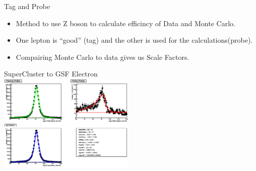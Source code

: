 

\begin{frame}{Tag and Probe}
\begin {itemize}
  \item
    Method to use Z boson to calculate efficincy of Data and Monte Carlo.
  \item
    One lepton is ``good'' (tag) and the other is used for the calculations(probe).
  \item
    Compairing Monte Carlo to data gives us Scale Factors.
\end{itemize}
\begin{center}
SuperCluster to GSF Electron\\
\includegraphics[width=0.49\textwidth]{images/SC_fit.eps}
\end{center}
\end{frame}



